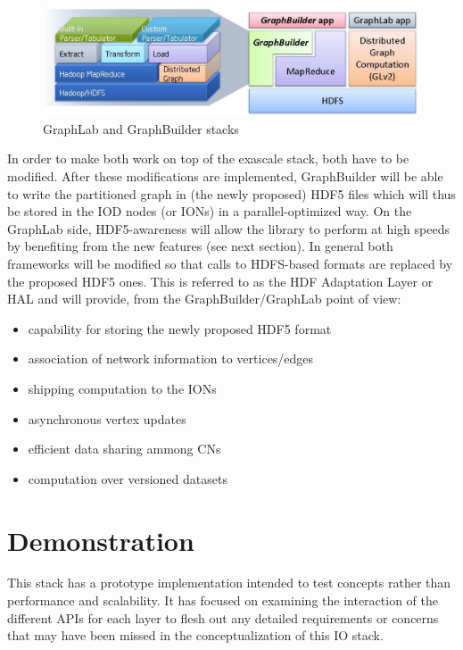 \documentclass[conference]{IEEEtran}
\begin{document}
\begin{figure}[htbp]
\centering
\includegraphics[scale=0.15]{images/graphlab-and-graphbuilder.png}
\caption{GraphLab and GraphBuilder stacks}
\label{fig:graphlab-graphbuilder}
\end{figure}

In order to make both work on top of the exascale stack, both have to be
modified. After these modifications are implemented, GraphBuilder will
be able to write the partitioned graph in (the newly proposed) HDF5
files which will thus be stored in the IOD nodes (or IONs) in a
parallel-optimized way. On the GraphLab side, HDF5-awareness will allow
the library to perform at high speeds by benefiting from the new
features (see next section). In general both frameworks will be modified
so that calls to HDFS-based formats are replaced by the proposed HDF5
ones. This is referred to as the HDF Adaptation Layer or HAL and will
provide, from the GraphBuilder/GraphLab point of view:

\begin{itemize}
\itemsep1pt\parskip0pt
\item
  capability for storing the newly proposed HDF5 format
\item
  association of network information to vertices/edges
\item
  shipping computation to the IONs
\item
  asynchronous vertex updates
\item
  efficient data sharing ammong CNs
\item
  computation over versioned datasets
\end{itemize}

\section{Demonstration}
This stack has a prototype implementation intended to test concepts rather
than performance and scalability. It has focused on examining the interaction
of the different APIs for each layer to flesh out any detailed requirements
or concerns that may have been missed in the conceptualization of this IO stack.
\end{document}
